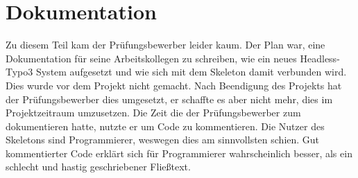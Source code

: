 \section{Dokumentation}
\label{sec:Dokumentation}

Zu diesem Teil kam der Prüfungsbewerber leider kaum. Der Plan war, eine Dokumentation für seine Arbeitskollegen zu schreiben, wie ein neues Headless-Typo3 System aufgesetzt und wie sich mit dem Skeleton damit verbunden wird. Dies wurde vor dem Projekt nicht gemacht. Nach Beendigung des Projekts hat der Prüfungsbewerber dies umgesetzt, er schaffte es aber nicht mehr, dies im Projektzeitraum umzusetzen. Die Zeit die der Prüfungsbewerber zum dokumentieren hatte, nutzte er um Code zu kommentieren. Die Nutzer des Skeletons sind Programmierer, weswegen dies am sinnvollsten schien. Gut kommentierter Code erklärt sich für Programmierer wahrscheinlich besser, als ein schlecht und hastig geschriebener Fließtext.

